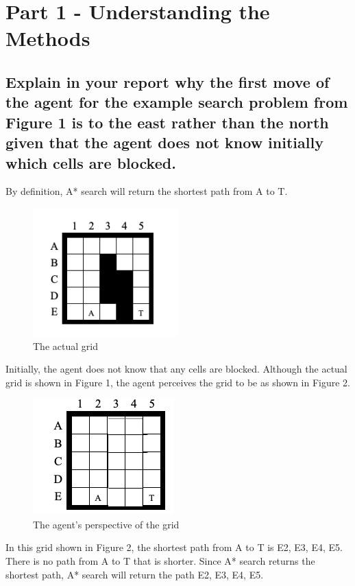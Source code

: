 \documentclass{article}
\begin{document}
\section{Part 1 - Understanding the Methods}

\subsection{Explain in your report why the first move of the agent for the example search problem from Figure 1  is to the east rather
than the north given that the agent does not know initially which cells are blocked.}

By definition, A* search will return the shortest path from A to T.\\

\begin{figure}[h!]
  \includegraphics[width=0.5\textwidth]{p1_0.png}
  \caption{The actual grid }
\end{figure}

Initially, the agent does not know that any cells are blocked. Although the actual grid is shown in Figure 1, the agent perceives the grid to be as shown in Figure 2.  \\

\begin{figure}[h!]
  \includegraphics[]{p1_1.png}
  \caption{The agent's perspective of the grid }
\end{figure}

In this grid shown in Figure 2, the shortest path from  A to T is E2, E3, E4, E5. There is no path from A to T that is shorter. Since A* search returns the shortest path, A* search will return the path E2, E3, E4, E5.\\
\end{document}
